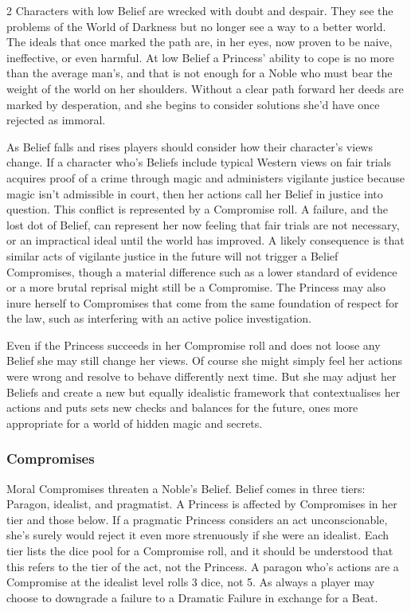 \begin{multicols}{2}
Characters with low Belief are wrecked with doubt and despair. They see the problems of the World of Darkness but no longer see a way to a better world. The ideals that once marked the path are, in her eyes, now proven to be naive, ineffective, or even harmful. At low Belief a Princess' ability to cope is no more than the average man's, and that is not enough for a Noble who must bear the weight of the world on her shoulders. Without a clear path forward her deeds are marked by desperation, and she begins to consider solutions she'd have once rejected as immoral.

As Belief falls and rises players should consider how their character's views change. If a character \textemdash who's Beliefs include typical Western views on fair trials \textemdash acquires proof of a crime through magic and administers vigilante justice because magic isn't admissible in court, then her actions call her Belief in justice into question. This conflict is represented by a Compromise roll. A failure, and the lost dot of Belief, can represent her now feeling that fair trials are not necessary, or an impractical ideal until the world has improved. A likely consequence is that similar acts of vigilante justice in the future will not trigger a Belief Compromises, though a material difference such as a lower standard of evidence or a more brutal reprisal might still be a Compromise. The Princess may also inure herself to Compromises that come from the same foundation of respect for the law, such as interfering with an active police investigation. 

Even if the Princess succeeds in her Compromise roll and does not loose any Belief she may still change her views. Of course she might simply feel her actions were wrong and resolve to behave differently next time. But she may adjust her Beliefs and create a new but equally idealistic framework that contextualises her actions and puts sets new checks and balances for the future, ones more appropriate for a world of hidden magic and secrets.  

\subsubsection*{Compromises}

Moral Compromises threaten a Noble's Belief. Belief comes in three tiers: Paragon, idealist, and pragmatist. A Princess is affected by Compromises in her tier and those below. If a pragmatic Princess considers an act unconscionable, she's surely would reject it even more strenuously if she were an idealist. Each tier lists the dice pool for a Compromise roll, and it should be understood that this refers to the tier of the act, not the Princess. A paragon who's actions are a Compromise at the idealist level rolls 3 dice, not 5. As always a player may choose to downgrade a failure to a Dramatic Failure in exchange for a Beat. 


\end{multicols}
